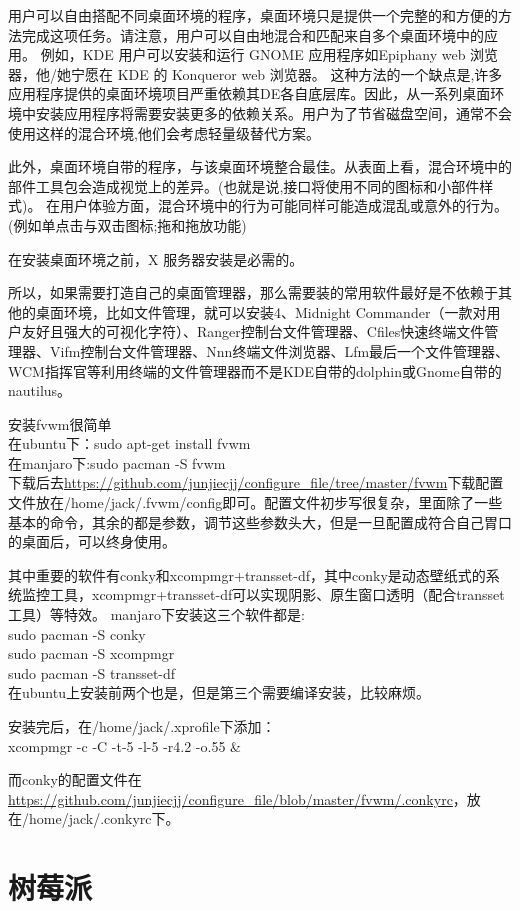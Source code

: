 \documentclass[utf8]{book}
\begin{document}
\begin{appendices}
	用户可以自由搭配不同桌面环境的程序，桌面环境只是提供一个完整的和方便的方法完成这项任务。请注意，用户可以自由地混合和匹配来自多个桌面环境中的应用。 例如，KDE 用户可以安装和运行 GNOME 应用程序如Epiphany web 浏览器，他/她宁愿在 KDE 的 Konqueror web 浏览器。 这种方法的一个缺点是,许多应用程序提供的桌面环境项目严重依赖其DE各自底层库。因此，从一系列桌面环境中安装应用程序将需要安装更多的依赖关系。用户为了节省磁盘空间，通常不会使用这样的混合环境,他们会考虑轻量级替代方案。
	
	此外，桌面环境自带的程序，与该桌面环境整合最佳。从表面上看，混合环境中的部件工具包会造成视觉上的差异。(也就是说,接口将使用不同的图标和小部件样式)。 在用户体验方面，混合环境中的行为可能同样可能造成混乱或意外的行为。(例如单点击与双击图标;拖和拖放功能)
	
	在安装桌面环境之前，X 服务器安装是必需的。
	
	所以，如果需要打造自己的桌面管理器，那么需要装的常用软件最好是不依赖于其他的桌面环境，比如文件管理，就可以安装4、Midnight Commander（一款对用户友好且强大的可视化字符）、Ranger控制台文件管理器、Cfiles快速终端文件管理器、Vifm控制台文件管理器、Nnn终端文件浏览器、Lfm最后一个文件管理器、WCM指挥官等利用终端的文件管理器而不是KDE自带的dolphin或Gnome自带的nautilus。
	
	安装fvwm很简单\\
	在ubuntu下：sudo apt-get install fvwm\\
	在manjaro下:sudo pacman -S fvwm\\
	
	下载后去\url{https://github.com/junjiecjj/configure_file/tree/master/fvwm}下载配置文件放在/home/jack/.fvwm/config即可。配置文件初步写很复杂，里面除了一些基本的命令，其余的都是参数，调节这些参数头大，但是一旦配置成符合自己胃口的桌面后，可以终身使用。
	
	其中重要的软件有conky和xcompmgr+transset-df，其中conky是动态壁纸式的系统监控工具，xcompmgr+transset-df可以实现阴影、原生窗口透明（配合transset工具）等特效。
	manjaro下安装这三个软件都是:\\
	sudo pacman -S conky\\
	sudo pacman -S xcompmgr\\
	sudo pacman -S transset-df\\
	
	在ubuntu上安装前两个也是，但是第三个需要编译安装，比较麻烦。
	
	安装完后，在/home/jack/.xprofile下添加：\\
	xcompmgr -c -C -t-5 -l-5 -r4.2 -o.55 \&
	
	而conky的配置文件在\url{https://github.com/junjiecjj/configure_file/blob/master/fvwm/.conkyrc}，放在/home/jack/.conkyrc下。
	\chapter{树莓派}\label{append4}
	\end{appendices}
	
\end{document}
